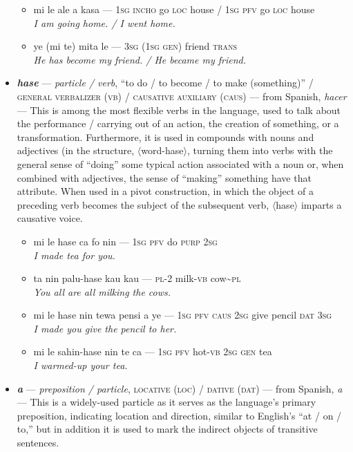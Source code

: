 \documentclass[a4paper, titlepage]{article}
\begin{document}
\begin{itemize}
\begin{itemize}
		\item mi le ale a kasa — \textsc{1sg incho} go \textsc{loc} house /  \textsc{1sg pfv} go \textsc{loc} house  \\\textit{I am going home. / I went home.}
		\item ye (mi te) mita le — \textsc{3sg (1sg gen)} friend \textsc{trans} \\\textit{He has become my friend. / He became my friend.}
	\end{itemize}
	\item \textbf{\textit{hase}} — \textit{particle / verb}, ``to do / to become / to make (something)'' / \textsc{general verbalizer (vb) / causative auxiliary (caus)} — from Spanish, \textit{hacer} — This is among the most flexible verbs in the language, used to talk about the performance / carrying out of an action, the creation of something, or a transformation. Furthermore, it is used in compounds with nouns and adjectives (in the structure, $\langle$word-hase$\rangle$, turning them into verbs with the general sense of ``doing'' some typical action associated with a noun or, when combined with adjectives, the sense of ``making'' something have that attribute. When used in a pivot construction, in which the object of a preceding verb becomes the subject of the subsequent verb, $\langle$hase$\rangle$ imparts a causative voice.
	\begin{itemize}
		\item mi le hase ca fo nin — \textsc{1sg pfv} do \textsc{purp 2sg} \\\textit{I made tea for you.}
		\item ta nin palu-hase kau kau  — \textsc{pl-2} milk-\textsc{vb} cow\textasciitilde{}\textsc{pl} \\\textit{You all are all milking the cows.}
		\item mi le hase nin tewa pensi a ye — \textsc{1sg pfv caus} \textsc{2sg} give pencil \textsc{dat 3sg} \\\textit{I made you give the pencil to her.}
		\item mi le sahin-hase nin te ca — \textsc{1sg pfv} hot-\textsc{vb} \textsc{2sg gen} tea \\\textit{I warmed-up your tea.}
	\end{itemize}
	\item \textbf{\textit{a}} — \textit{preposition / particle}, \textsc{locative (loc) / dative (dat)} — from Spanish, \textit{a} — This is a widely-used particle as it serves as the language's primary preposition, indicating location and direction, similar to English's ``at / on / to,'' but in addition it is used to mark the indirect objects of transitive sentences.

\end{itemize}
\end{document}
